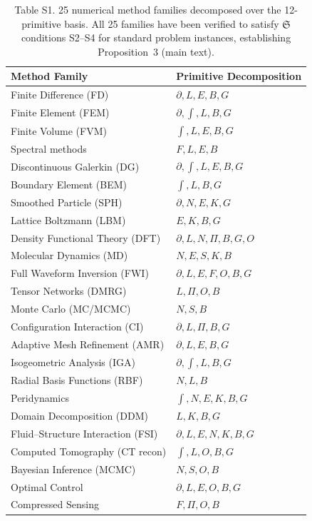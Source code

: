 \documentclass[11pt,a4paper]{article}
\newcommand{\Sclass}{\mathfrak{S}}
\begin{document}
\begin{table}[htbp]
\centering
\caption{Table S1. 25 numerical method families decomposed over the 12-primitive basis. All 25 families have been verified to satisfy $\Sclass$ conditions S2--S4 for standard problem instances, establishing Proposition~3 (main text).}
\small
\begin{tabularx}{\textwidth}{lX}
\toprule
\textbf{Method Family} & \textbf{Primitive Decomposition} \\
\midrule
Finite Difference (FD) & $\partial, L, E, B, G$ \\
Finite Element (FEM) & $\partial, \int, L, B, G$ \\
Finite Volume (FVM) & $\int, L, E, B, G$ \\
Spectral methods & $F, L, E, B$ \\
Discontinuous Galerkin (DG) & $\partial, \int, L, E, B, G$ \\
Boundary Element (BEM) & $\int, L, B, G$ \\
Smoothed Particle (SPH) & $\partial, N, E, K, G$ \\
Lattice Boltzmann (LBM) & $E, K, B, G$ \\
Density Functional Theory (DFT) & $\partial, L, N, \Pi, B, G, O$ \\
Molecular Dynamics (MD) & $N, E, S, K, B$ \\
Full Waveform Inversion (FWI) & $\partial, L, E, F, O, B, G$ \\
Tensor Networks (DMRG) & $L, \Pi, O, B$ \\
Monte Carlo (MC/MCMC) & $N, S, B$ \\
Configuration Interaction (CI) & $\partial, L, \Pi, B, G$ \\
Adaptive Mesh Refinement (AMR) & $\partial, L, E, B, G$ \\
Isogeometric Analysis (IGA) & $\partial, \int, L, B, G$ \\
Radial Basis Functions (RBF) & $N, L, B$ \\
Peridynamics & $\int, N, E, K, B, G$ \\
Domain Decomposition (DDM) & $L, K, B, G$ \\
Fluid--Structure Interaction (FSI) & $\partial, L, E, N, K, B, G$ \\
Computed Tomography (CT recon) & $\int, L, O, B, G$ \\
Bayesian Inference (MCMC) & $N, S, O, B$ \\
Optimal Control & $\partial, L, E, O, B, G$ \\
Compressed Sensing & $F, \Pi, O, B$ \\

\end{tabularx}
\end{table}
\end{document}
